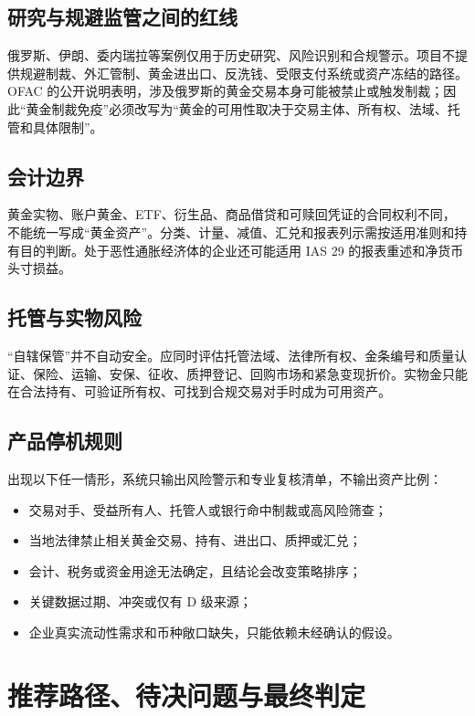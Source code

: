\documentclass[UTF8,12pt,openany]{ctexbook}
\begin{document}
\section{研究与规避监管之间的红线}
俄罗斯、伊朗、委内瑞拉等案例仅用于历史研究、风险识别和合规警示。项目不提供规避制裁、外汇管制、黄金进出口、反洗钱、受限支付系统或资产冻结的路径。OFAC 的公开说明表明，涉及俄罗斯的黄金交易本身可能被禁止或触发制裁\autocite{ofac1029}；因此“黄金制裁免疫”必须改写为“黄金的可用性取决于交易主体、所有权、法域、托管和具体限制”。

\section{会计边界}
黄金实物、账户黄金、ETF、衍生品、商品借贷和可赎回凭证的合同权利不同，不能统一写成“黄金资产”。分类、计量、减值、汇兑和报表列示需按适用准则和持有目的判断\autocite{ifrscommodity2016,ifrsias2}。处于恶性通胀经济体的企业还可能适用 IAS 29 的报表重述和净货币头寸损益\autocite{ifrsias29}。

\section{托管与实物风险}
“自辖保管”并不自动安全。应同时评估托管法域、法律所有权、金条编号和质量认证、保险、运输、安保、征收、质押登记、回购市场和紧急变现折价。实物金只能在合法持有、可验证所有权、可找到合规交易对手时成为可用资产。

\section{产品停机规则}
出现以下任一情形，系统只输出风险警示和专业复核清单，不输出资产比例：

\begin{itemize}
  \item 交易对手、受益所有人、托管人或银行命中制裁或高风险筛查；
  \item 当地法律禁止相关黄金交易、持有、进出口、质押或汇兑；
  \item 会计、税务或资金用途无法确定，且结论会改变策略排序；
  \item 关键数据过期、冲突或仅有 D 级来源；
  \item 企业真实流动性需求和币种敞口缺失，只能依赖未经确认的假设。
\end{itemize}

\chapter{推荐路径、待决问题与最终判定}
\end{document}
